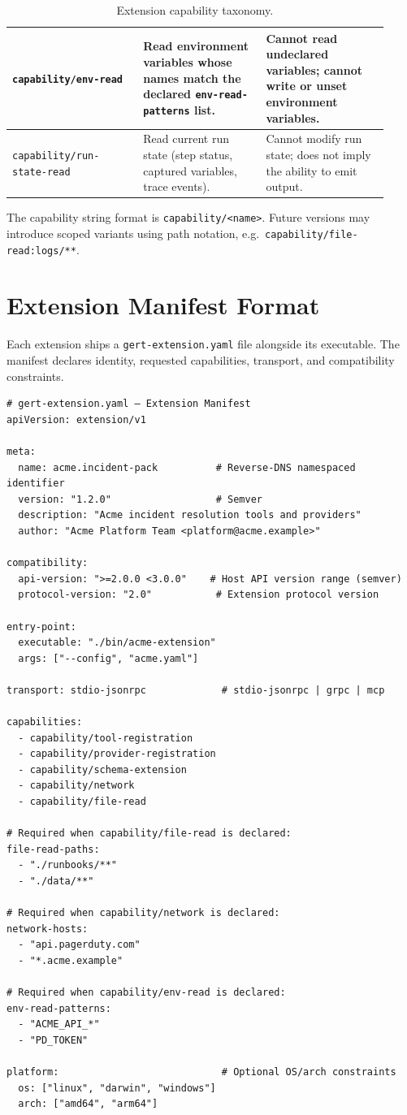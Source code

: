 \begin{table}[ht]
\begin{tabular}{p{0.32\linewidth}p{0.30\linewidth}p{0.30\linewidth}}
\hline
\texttt{capability/env-read} &
  Read environment variables whose names match the declared
  \texttt{env-read-patterns} list. &
  Cannot read undeclared variables; cannot write or unset environment
  variables. \\
\hline
\texttt{capability/run-state-read} &
  Read current run state (step status, captured variables, trace events). &
  Cannot modify run state; does not imply the ability to emit output. \\
\hline
\end{tabular}
\caption{Extension capability taxonomy.}
\label{tab:capabilities}
\end{table}

The capability string format is \texttt{capability/<name>}.  Future versions
may introduce scoped variants using path notation, e.g.\
\texttt{capability/file-read:logs/**}.

\section{Extension Manifest Format}
\label{sec:ext-manifest}

Each extension ships a \texttt{gert-extension.yaml} file alongside its
executable.  The manifest declares identity, requested capabilities, transport,
and compatibility constraints.

\begin{verbatim}
# gert-extension.yaml — Extension Manifest
apiVersion: extension/v1

meta:
  name: acme.incident-pack          # Reverse-DNS namespaced identifier
  version: "1.2.0"                  # Semver
  description: "Acme incident resolution tools and providers"
  author: "Acme Platform Team <platform@acme.example>"

compatibility:
  api-version: ">=2.0.0 <3.0.0"    # Host API version range (semver)
  protocol-version: "2.0"           # Extension protocol version

entry-point:
  executable: "./bin/acme-extension"
  args: ["--config", "acme.yaml"]

transport: stdio-jsonrpc             # stdio-jsonrpc | grpc | mcp

capabilities:
  - capability/tool-registration
  - capability/provider-registration
  - capability/schema-extension
  - capability/network
  - capability/file-read

# Required when capability/file-read is declared:
file-read-paths:
  - "./runbooks/**"
  - "./data/**"

# Required when capability/network is declared:
network-hosts:
  - "api.pagerduty.com"
  - "*.acme.example"

# Required when capability/env-read is declared:
env-read-patterns:
  - "ACME_API_*"
  - "PD_TOKEN"

platform:                            # Optional OS/arch constraints
  os: ["linux", "darwin", "windows"]
  arch: ["amd64", "arm64"]
\end{verbatim}

